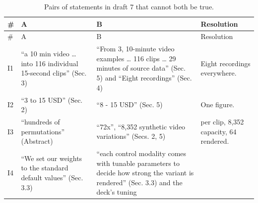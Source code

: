 \documentclass[
  11pt,
]{article}
\begin{document}
\begin{longtable}[]{@{}
  >{\raggedright\arraybackslash}p{}
  >{\raggedright\arraybackslash}p{}
  >{\raggedright\arraybackslash}p{}
  >{\raggedright\arraybackslash}p{}@{}}
\caption{Pairs of statements in draft 7 that cannot both be
true.}\tabularnewline
\toprule\noalign{}
\begin{minipage}[b]{\linewidth}\raggedright
\#
\end{minipage} & \begin{minipage}[b]{\linewidth}\raggedright
A
\end{minipage} & \begin{minipage}[b]{\linewidth}\raggedright
B
\end{minipage} & \begin{minipage}[b]{\linewidth}\raggedright
Resolution
\end{minipage} \\
\midrule\noalign{}
\endfirsthead
\toprule\noalign{}
\begin{minipage}[b]{\linewidth}\raggedright
\#
\end{minipage} & \begin{minipage}[b]{\linewidth}\raggedright
A
\end{minipage} & \begin{minipage}[b]{\linewidth}\raggedright
B
\end{minipage} & \begin{minipage}[b]{\linewidth}\raggedright
Resolution
\end{minipage} \\
\midrule\noalign{}
\endhead
\bottomrule\noalign{}
\endlastfoot
I1 & ``a 10 min video \ldots{} into 116 individual 15-second clips''
(Sec. 3) & ``From 3, 10-minute video examples \ldots{} 116 clips
\ldots{} 29 minutes of source data'' (Sec. 5) and ``Eight recordings''
(Sec. 4) & Eight recordings everywhere. \\
I2 & ``3 to 15 USD'' (Sec. 2) & ``8 - 15 USD'' (Sec. 5) & One figure. \\
I3 & ``hundreds of permutations'' (Abstract) & ``72x'', ``8,352
synthetic video variations'' (Secs. 2, 5) & 72 per clip, 8,352 capacity,
64 rendered. \\
I4 & ``We set our weights to the standard default values'' (Sec. 3.3) &
``each control modality comes with tunable parameters to decide how
strong the variant is rendered'' (Sec. 3.3) and the deck's tuning

\end{longtable}
\end{document}
